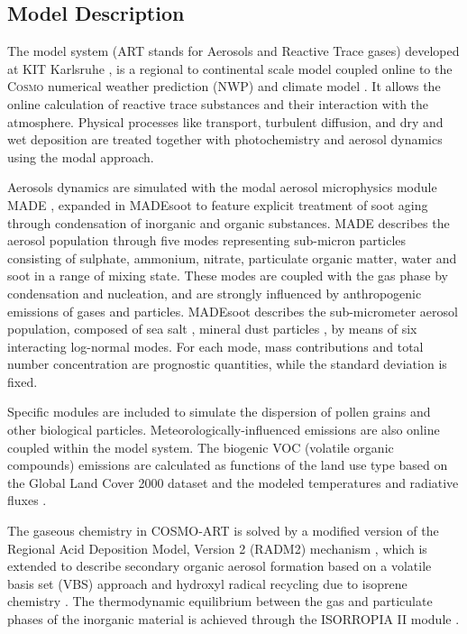 \subsection{Model Description}
\label{subsec:1.1}

The model system \cosmoart (ART stands for Aerosols and Reactive Trace
gases) developed at KIT  Karlsruhe \cite{Vogel-2009}, is a regional to
continental scale model coupled online to the \textsc{Cosmo} numerical
weather  prediction (NWP) and  climate model  \cite{Baldauf-2011}.  It
allows the  online calculation of reactive trace  substances and their
interaction with  the atmosphere.  Physical  processes like transport,
turbulent diffusion,  and dry and wet deposition  are treated together
with photochemistry and aerosol dynamics using the modal approach.

Aerosols dynamics  are simulated  with the modal  aerosol microphysics
module  MADE \cite{Ackermann-1998},  expanded in  MADEsoot  to feature
explicit  treatment of  soot aging  through condensation  of inorganic
\cite{Riemer-2003} and organic  substances. MADE describes the aerosol
population  through  five   modes  representing  sub-micron  particles
consisting of sulphate, ammonium, nitrate, particulate organic matter,
water and  soot \cite{Riemer-2004} in  a range of mixing  state. These
modes are coupled  with the gas phase by  condensation and nucleation,
and are  strongly influenced by  anthropogenic emissions of  gases and
particles. MADEsoot  describes the sub-micrometer  aerosol population,
composed  of  sea salt  \cite{Lundgren-2013},  mineral dust  particles
\cite{Vogel-2006,   Stanelle-2010},  by   means  of   six  interacting
log-normal modes.  For each  mode, mass contributions and total number
concentration are prognostic  quantities, while the standard deviation
is fixed.

Specific  modules are included  to simulate  the dispersion  of pollen
grains    \cite{Vogel-2008}    and    other   biological    particles.
Meteorologically-influenced emissions  are also online  coupled within
the  model  system.  The  biogenic  VOC  (volatile organic  compounds)
emissions are  calculated as functions of  the land use  type based on
the Global  Land Cover 2000  dataset and the modeled  temperatures and
radiative fluxes \cite{Vogel-1995}.

The gaseous chemistry in COSMO-ART  is solved by a modified version of
the  Regional  Acid  Deposition  Model, Version  2  (RADM2)  mechanism
\cite{Stockwell-1990}, which is extended to describe secondary organic
aerosol  formation  based  on  a  volatile basis  set  (VBS)  approach
\cite{Athanasopoulou-2013}  and  hydroxyl  radical  recycling  due  to
isoprene chemistry  \cite{Geiger-2003}.  The thermodynamic equilibrium
between the  gas and particulate  phases of the inorganic  material is
achieved through the ISORROPIA II module \cite{Fountoukis-2007}.

